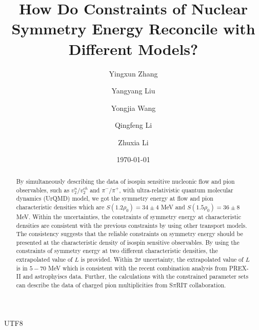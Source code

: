 \documentclass[reprint,aps,prc,twocolumn,superscriptaddress]{revtex4-1}
\begin{document}
\begin{CJK*} {UTF8}{} %

\title{How Do Constraints of Nuclear Symmetry Energy Reconcile with Different Models?}

\author{Yingxun Zhang}

\author{Yangyang Liu}

\author{Yongjia Wang}

\author{Qingfeng Li}


\author{Zhuxia Li}







\date{\today}


\begin{abstract}
By simultaneously describing the data of isospin sensitive nucleonic flow and pion observables, such as $v_2^n/v_2^{ch}$ and $\pi^-/\pi^+$, with ultra-relativistic quantum molecular dynamics (UrQMD) model, we got the symmetry energy at flow and pion characteristic densities which are $S(1.2\rho_0)=34\pm 4$ MeV and $S(1.5\rho_0)=36\pm 8$ MeV. Within the uncertainties, the constraints of symmetry energy at characteristic densities are consistent with the previous constraints by using other transport models. The consistency suggests that the reliable constraints on symmetry energy should be presented at the characteristic density of isospin sensitive observables. By using the constraints of symmetry energy at two different characteristic densities, the extrapolated value of $L$ is provided. Within $2\sigma$ uncertainty, the extrapolated value of $L$ is in $5-70$ MeV which is consistent with the recent combination analysis from PREX-II and astrophyiscs data. Further, the calculations with the constrained parameter sets can describe the data of charged pion multiplicities from S$\pi$RIT collaboration. 


\end{abstract}
\end{CJK*}
\end{document}
